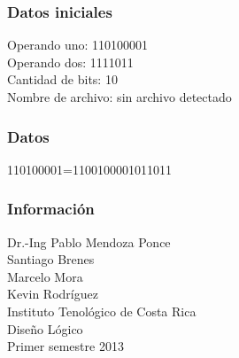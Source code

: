 \documentclass{beamer}
\begin{document}
\begin{frame}\frametitle{Datos iniciales}Operando uno: 110100001\\Operando dos: 1111011\\Cantidad de bits: 10\\Nombre de archivo: sin archivo detectado\end{frame}
\begin{frame}\frametitle{Datos}110100001=1100100001011011\end{frame}
\begin{frame}\frametitle{Informaci\'on}Dr.-Ing Pablo Mendoza Ponce \\ Santiago Brenes \\ Marcelo Mora \\ Kevin Rodr\'iguez \\ Instituto Tenol\'ogico de Costa Rica \\ Dise\~{n}o L\'ogico \\ Primer semestre 2013\end{frame}
\end{document}

